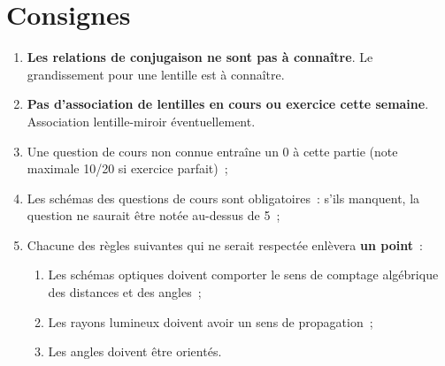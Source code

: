 \documentclass[a4paper, 12pt, final, garamond]{book}
\begin{document}
\section{Consignes}
\begin{enumerate}
    \item \textbf{Les relations de conjugaison ne sont pas à connaître}. Le
        grandissement pour une lentille est à connaître.
    \item \textbf{Pas d'association de lentilles en cours ou exercice cette
        semaine}. Association lentille-miroir éventuellement.
    \item Une question de cours non connue entraîne un 0 à cette partie (note
        maximale 10/20 si exercice parfait)~;
    \item Les schémas des questions de cours sont obligatoires~: s'ils manquent,
        la question ne saurait être notée au-dessus de 5~;
    \item Chacune des règles suivantes qui ne serait respectée enlèvera
        \textbf{un point}~:
        \begin{enumerate}
            \item Les schémas optiques doivent comporter le sens de comptage
                algébrique des distances et des angles~;
            \item Les rayons lumineux doivent avoir un sens de propagation~;
            \item Les angles doivent être orientés.
        \end{enumerate}
\end{enumerate}
\end{document}

